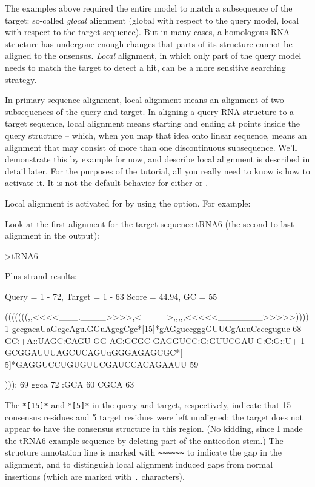 The examples above required the entire model to match a subsequence of
the target: so-called \emph{glocal} alignment (global with respect to
the query model, local with respect to the target sequence). But in
many cases, a homologous RNA structure has undergone enough changes
that parts of its structure cannot be aligned to the
onsensus. \emph{Local} alignment, in which only part of the query
model needs to match the target to detect a hit, can be a more
sensitive searching strategy.

In primary sequence alignment, local alignment means an alignment of
two subsequences of the query and target. In aligning a query RNA
structure to a target sequence, local alignment means starting and
ending at points inside the query structure -- which, when you map
that idea onto linear sequence, means an alignment that may consist of
more than one discontinuous subsequence. We'll demonstrate this by
example for now, and describe local alignment is described in detail
later.  For the purposes of the tutorial, all you really need to know
is how to activate it. It is not the default behavior for either
 or .

Local alignment is activated for  by using the
 option. For example:


Look at the first alignment for the target sequence tRNA6 (the second
to last alignment in the output): 

\begin{sreoutput}
>tRNA6

  Plus strand results:

 Query = 1 - 72, Target = 1 - 63
 Score = 44.94, GC =  55

           (((((((,,<<<<___.____>>>>,<~~~~~~>,,,,,<<<<<_______>>>>>))))
         1 gccgacaUaGcgcAgu.GGuAgcgCgc*[15]*gAGguccgggGUUCgAuuCcccguguc 68      
           GC:+A::UAGC:CAGU GG AG:GCGC      GAGGUCC:G:GUUCGAU C:C:G::U+
         1 GCGGAUUUAGCUCAGUuGGGAGAGCGC*[ 5]*GAGGUCCUGUGUUCGAUCCACAGAAUU 59      

           ))):
        69 ggca 72      
           :GCA
        60 CGCA 63      
\end{sreoutput}

The \verb+*[15]*+ and \verb+*[5]*+ in the query and target,
respectively, indicate that 15 consensus residues and 5 target
residues were left unaligned; the target does not appear to have the
consensus structure in this region. (No kidding, since I made the
tRNA6 example sequence by deleting part of the anticodon stem.)  The
structure annotation line is marked with \verb+~~~~~~+ to indicate the
gap in the alignment, and to distinguish local alignment induced gaps
from normal insertions (which are marked with \verb+.+ characters).


